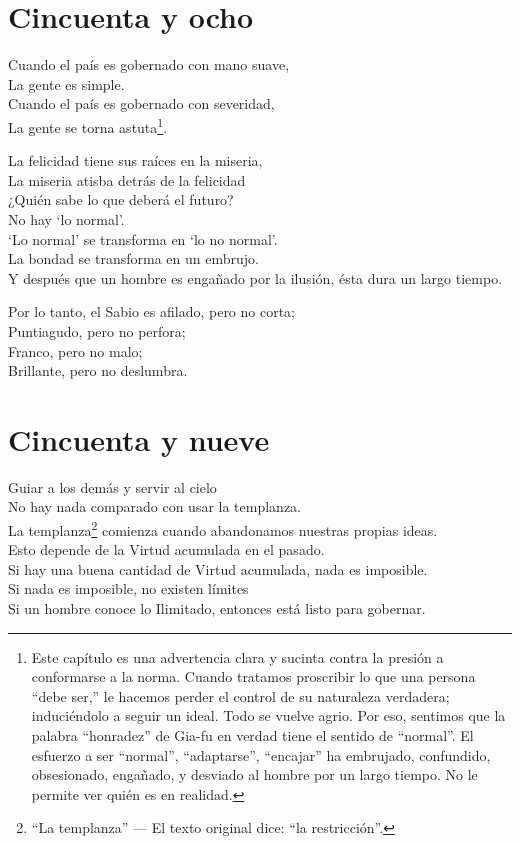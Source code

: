 \documentclass[hidelinks]{memoir}
\begin{document}
	\chapter*{Cincuenta y ocho}
	
	Cuando el país es gobernado con mano suave,\\
	La gente es simple.\\
	Cuando el país es gobernado con severidad,\\
	La gente se torna astuta\footnote{Este capítulo es una advertencia clara y sucinta contra la presión a
		conformarse a la norma. Cuando tratamos proscribir lo que una persona
		``debe ser,'' le hacemos perder el control de su naturaleza verdadera;
		induciéndolo a seguir un ideal. Todo se vuelve agrio. Por eso, sentimos
		que la palabra ``honradez'' de Gia-fu en verdad tiene el sentido de
		``normal''. El esfuerzo a ser ``normal'', ``adaptarse'', ``encajar'' ha
		embrujado, confundido, obsesionado, engañado, y desviado al hombre por
		un largo tiempo. No le permite ver quién es en realidad.}.
	
	La felicidad tiene sus raíces en la miseria,\\
	La miseria atisba detrás de la felicidad\\
	¿Quién sabe lo que deberá el futuro?\\
	No hay `lo normal'.\\
	`Lo normal' se transforma en `lo no normal'.\\
	La bondad se transforma en un embrujo.\\
	Y después que un hombre es engañado por la ilusión, ésta dura un largo
	tiempo.
	
	Por lo tanto, el Sabio es afilado, pero no corta;\\
	Puntiagudo, pero no perfora;\\
	Franco, pero no malo;\\
	Brillante, pero no deslumbra.
	
	\chapter*{Cincuenta y nueve}
	
	Guiar a los demás y servir al cielo\\
	No hay nada comparado con usar la templanza.\\
	La templanza\footnote{``La templanza'' --- El texto original dice: ``la restricción''.} comienza cuando abandonamos nuestras propias ideas.\\
	Esto depende de la Virtud acumulada en el pasado.\\
	Si hay una buena cantidad de Virtud acumulada, nada es imposible.\\
	Si nada es imposible, no existen límites\\
	Si un hombre conoce lo Ilimitado, entonces está listo para gobernar.
	
\end{document}
